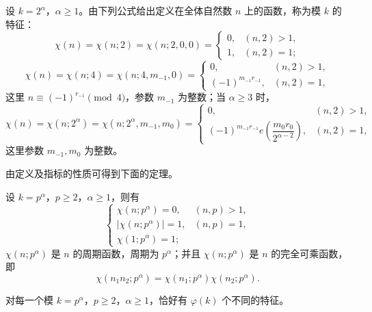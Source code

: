 \begin{definition}[原文 定义 2]
	设 $k=2^\alpha$，$\alpha\geq 1$。由下列公式给出定义在全体自然数 $n$ 上的函数，称为模 $k$ 的特征：
	\begin{equation}
		\chi(n)=\chi(n;2)=\chi(n;2,0,0)=
		\begin{cases}
			0, & (n,2)>1,\\
			1, & (n,2)=1;
		\end{cases}
		\tag{2}
	\end{equation}
	\begin{equation}
		\chi(n)=\chi(n;4)=\chi(n;4,m_{-1},0)=
		\begin{cases}
			0, & (n,2)>1,\\
			(-1)^{m_{-1}r_{-1}}, & (n,2)=1,
		\end{cases}
		\tag{3}
	\end{equation}
	这里 $n\equiv (-1)^{r_{-1}}\pmod 4$，参数 $m_{-1}$ 为整数；当 $\alpha\geq 3$ 时，
	\begin{equation}
		\chi(n)=\chi(n;2^\alpha)=\chi(n;2^\alpha,m_{-1},m_0)=
		\begin{cases}
			0, & (n,2)>1,\\
			(-1)^{m_{-1}r_{-1}}e\left(\dfrac{m_0r_0}{2^{\alpha-2}}\right), & (n,2)=1,
		\end{cases}
		\tag{4}
	\end{equation}
	这里参数 $m_{-1},m_0$ 为整数。
\end{definition}

由定义及指标的性质可得到下面的定理。

\begin{theorem}[原文 定理 1]
	设 $k=p^\alpha$，$p\geq 2$，$\alpha\geq 1$，则有
	\[
	\begin{cases}
		\chi(n;p^\alpha)=0, & (n,p)>1,\\
		|\chi(n;p^\alpha)|=1, & (n,p)=1,\\
		\chi(1;p^\alpha)=1;
	\end{cases}
	\]
	$\chi(n;p^\alpha)$ 是 $n$ 的周期函数，周期为 $p^\alpha$；并且 $\chi(n;p^\alpha)$ 是 $n$ 的完全可乘函数，即
	\[
		\chi(n_1n_2;p^\alpha)=\chi(n_1;p^\alpha)\chi(n_2;p^\alpha).
	\]
\end{theorem}

\begin{theorem}[原文 定理 2]
	对每一个模 $k=p^\alpha$，$p\geq 2$，$\alpha\geq 1$，恰好有 $\varphi(k)$ 个不同的特征。
\end{theorem}

